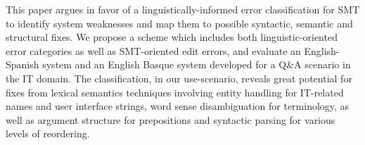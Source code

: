 This paper argues in favor of a linguistically-informed error classification for SMT to identify system weaknesses and map them to possible syntactic, semantic and structural fixes. We propose a scheme which includes both linguistic-oriented error categories as well as SMT-oriented edit errors, and evaluate an English-Spanish system and an English Basque system developed for a Q\&A scenario in the IT domain. The classification, in our use-scenario, reveals great potential for fixes from lexical semantics techniques involving entity handling for IT-related names and user interface strings, word sense disambiguation for terminology, as well as argument structure for prepositions and syntactic parsing for various levels of reordering.
